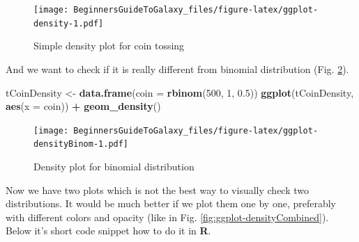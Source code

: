 \documentclass[]{book}
\newenvironment{Shaded}{\begin{snugshade}}{\end{snugshade}}
\newcommand{\KeywordTok}[1]{\textcolor[rgb]{0.13,0.29,0.53}{\textbf{#1}}}
\newcommand{\DataTypeTok}[1]{\textcolor[rgb]{0.13,0.29,0.53}{#1}}
\newcommand{\DecValTok}[1]{\textcolor[rgb]{0.00,0.00,0.81}{#1}}
\newcommand{\FloatTok}[1]{\textcolor[rgb]{0.00,0.00,0.81}{#1}}
\newcommand{\StringTok}[1]{\textcolor[rgb]{0.31,0.60,0.02}{#1}}
\newcommand{\OperatorTok}[1]{\textcolor[rgb]{0.81,0.36,0.00}{\textbf{#1}}}
\newcommand{\NormalTok}[1]{#1}
\theoremstyle{definition}
\theoremstyle{definition}
\theoremstyle{definition}
\theoremstyle{remark}
\begin{document}
\begin{figure}
\centering
\texttt{[image: BeginnersGuideToGalaxy\_files/figure-latex/ggplot-density-1.pdf]}
\caption{\label{fig:ggplot-density}Simple density plot for coin tossing}
\end{figure}

And we want to check if it is really different from binomial
distribution (Fig. \ref{fig:ggplot-densityBinom}).

\begin{Shaded}
\begin{Highlighting}[]
\NormalTok{tCoinDensity <-}\StringTok{ }\KeywordTok{data.frame}\NormalTok{(}\DataTypeTok{coin =} \KeywordTok{rbinom}\NormalTok{(}\DecValTok{500}\NormalTok{, }\DecValTok{1}\NormalTok{, }\FloatTok{0.5}\NormalTok{))}
\KeywordTok{ggplot}\NormalTok{(tCoinDensity, }\KeywordTok{aes}\NormalTok{(}\DataTypeTok{x =}\NormalTok{ coin)) }\OperatorTok{+}\StringTok{ }\KeywordTok{geom_density}\NormalTok{()}
\end{Highlighting}
\end{Shaded}

\begin{figure}
\centering
\texttt{[image: BeginnersGuideToGalaxy\_files/figure-latex/ggplot-densityBinom-1.pdf]}
\caption{\label{fig:ggplot-densityBinom}Density plot for binomial
distribution}
\end{figure}

Now we have two plots which is not the best way to visually check two
distributions. It would be much better if we plot them one by one,
preferably with different colors and opacity (like in Fig.
\ref{fig:ggplot-densityCombined}). Below it's short code snippet how to
do it in \textbf{R}.

\begin{Shaded}
\end{Shaded}
\end{document}
